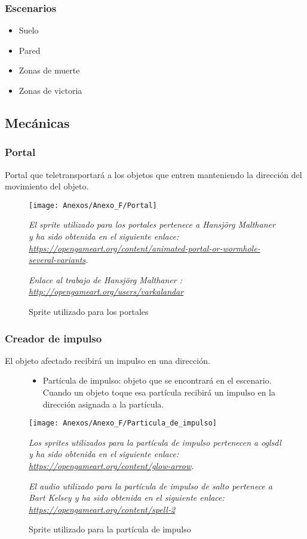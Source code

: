 \subsubsection{Escenarios}
\begin{itemize}
\item
Suelo
\item
Pared
\item
Zonas de muerte
\item
Zonas de victoria
\end{itemize}

\subsection{Mecánicas}
\subsubsection{Portal}
Portal que teletransportará a los objetos que entren manteniendo la dirección del movimiento del objeto.

\begin{figure}[h]
\centering
\texttt{[image: Anexos/Anexo\_F/Portal]}
\caption{Sprite utilizado para los portales}
\raggedright
\textit{El sprite utilizado para los portales pertenece a Hansjörg Malthaner y ha sido obtenida en el siguiente enlace: \url{https://opengameart.org/content/animated-portal-or-wormhole-several-variants}.}

\textit{Enlace al trabajo de Hansjörg Malthaner : \url{http://opengameart.org/users/varkalandar}}
\end{figure}

\subsubsection{Creador de impulso}
El objeto afectado recibirá un impulso en una dirección.
\begin{figure}[h]
\begin{itemize}
\item
Partícula de impulso: objeto que se encontrará en el escenario. Cuando un objeto toque esa partícula recibirá un impulso en la dirección asignada a la partícula.
\end{itemize}
\centering
\texttt{[image: Anexos/Anexo\_F/Particula\_de\_impulso]}
\caption{Sprite utilizado para la partícula de impulso}
\raggedright
\textit{Los sprites utilizados para la partícula de impulso pertenecen a oglsdl y ha sido obtenida en el siguiente enlace: \url{https://opengameart.org/content/glow-arrow}.}

\textit{El audio utilizado para la partícula de impulso de salto pertenece a Bart Kelsey y ha sido obtenida en el siguiente enlace: \url{https://opengameart.org/content/spell-2}}
\end{figure}

